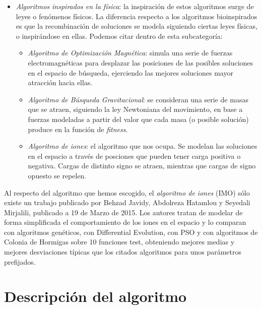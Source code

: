 \documentclass[a4paper,11pt]{article}
\begin{document}
\begin{itemize}
 \item \textit{Algoritmos inspirados en la física}: la inspiración de estos algoritmos surge de leyes o fenómenos físicos.
 La diferencia respecto a los algoritmos bioinspirados es que la recombinación de soluciones se modela siguiendo ciertas
 leyes físicas, o inspirándose en ellas. Podemos citar dentro de esta subcategoría:
 
  \begin{itemize}
    \item \textit{Algoritmo de Optimización Magnética}: simula una serie de fuerzas electromagnéticas para desplazar las posiciones
    de las posibles soluciones en el espacio de búsqueda, ejerciendo las mejores soluciones mayor atracción hacia ellas.
    
    \item \textit{Algoritmo de Búsqueda Gravitacional}: se consideran una serie de masas que se atraen, siguiendo la ley
    Newtoniana del movimiento, en base a fuerzas modeladas a partir del valor que cada masa (o posible solución) produce
    en la función de \textit{fitness}.
    
    \item \textit{Algoritmo de iones}: el algoritmo que nos ocupa. Se modelan las soluciones en el espacio a través de posciones
    que pueden tener carga positiva o negativa. Cargas de distinto signo se atraen, mientras que cargas de signo opuesto se repelen.
  \end{itemize}
\end{itemize}

Al respecto del algoritmo que hemos escogido, el \textit{algoritmo de iones} (IMO) sólo existe un trabajo publicado por Behzad Javidy, 
Abdolreza Hatamlou y Seyedali Mirjalili, publicado a 19 de Marzo de 2015. Los autores tratan de modelar de forma
simplificada el comportamiento de los iones en el espacio y lo comparan con algoritmos genéticos, con Differential Evolution,
con PSO y con algoritmos de Colonia de Hormigas sobre 10 funciones test,
 obteniendo mejores medias y mejores desviaciones
típicas que los citados algoritmos para unos parámetros prefijados.

\section{Descripción del algoritmo}
\end{document}
